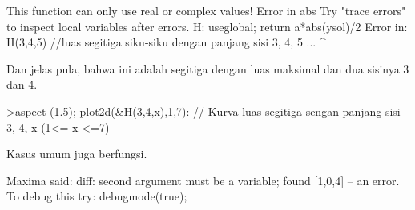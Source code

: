 \documentclass[a4paper,10pt]{article}
\begin{document}
\begin{eulernotebook}
\begin{eulercomment}
\begin{eulercomment}
\begin{eulercomment}
\begin{eulercomment}
\begin{eulercomment}
\begin{eulercomment}
\begin{eulercomment}
\begin{eulercomment}
\begin{eulercomment}
\begin{eulercomment}
\begin{eulercomment}
\begin{eulercomment}
\begin{eulercomment}
\begin{eulercomment}
\begin{eulercomment}
\begin{eulercomment}
\begin{eulercomment}
\begin{eulercomment}
\begin{eulercomment}
\begin{eulercomment}
\begin{eulercomment}
\begin{eulercomment}
\begin{eulercomment}
\begin{eulercomment}
\begin{eulercomment}
\begin{eulercomment}
\begin{eulercomment}
\begin{eulercomment}
\begin{eulercomment}
\begin{eulercomment}
\begin{euleroutput}
  This function can only use real or complex values!
  Error in abs
  Try "trace errors" to inspect local variables after errors.
  H:
      useglobal; return a*abs(ysol)/2 
  Error in:
  H(3,4,5) //luas segitiga siku-siku dengan panjang sisi 3, 4, 5 ...
          ^
\end{euleroutput}
\begin{eulercomment}
Dan jelas pula, bahwa ini adalah segitiga dengan luas maksimal dan dua
sisinya 3 dan 4.
\end{eulercomment}
\begin{eulerprompt}
>aspect (1.5); plot2d(&H(3,4,x),1,7): // Kurva luas segitiga sengan panjang sisi 3, 4, x (1<= x <=7)
\end{eulerprompt}
\begin{eulercomment}
Kasus umum juga berfungsi.
\end{eulercomment}
\begin{euleroutput}
  Maxima said:
  diff: second argument must be a variable; found [1,0,4]
   -- an error. To debug this try: debugmode(true);
  

\end{euleroutput}
\end{eulercomment}
\end{eulercomment}
\end{eulercomment}
\end{eulercomment}
\end{eulercomment}
\end{eulercomment}
\end{eulercomment}
\end{eulercomment}
\end{eulercomment}
\end{eulercomment}
\end{eulercomment}
\end{eulercomment}
\end{eulercomment}
\end{eulercomment}
\end{eulercomment}
\end{eulercomment}
\end{eulercomment}
\end{eulercomment}
\end{eulercomment}
\end{eulercomment}
\end{eulercomment}
\end{eulercomment}
\end{eulercomment}
\end{eulercomment}
\end{eulercomment}
\end{eulercomment}
\end{eulercomment}
\end{eulercomment}
\end{eulercomment}
\end{eulercomment}
\end{eulernotebook}
\end{document}
